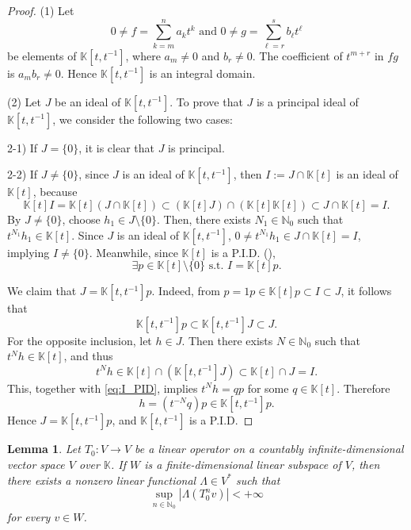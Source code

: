 \documentclass[11pt]{amsart}
\newtheorem{lemma}{Lemma}
\theoremstyle{definition}
\theoremstyle{remark}
\theoremstyle{plain}
\begin{document}
\begin{proof}
(1) Let
\[
0\ne f=\sum_{k=m}^{n}a_kt^k
\text{ and }
0\ne g=\sum_{\ell=r}^{s}b_\ell t^\ell
\]
be elements of \(\mathbb{K}[t,t^{-1}]\), where \(a_m\ne0\) and \(b_r\ne0\).
The coefficient of \(t^{m+r}\) in \(fg\) is \(a_mb_r\ne0\). Hence
\(\mathbb{K}[t,t^{-1}]\) is an integral domain.

\medskip

(2) Let \(J\) be an ideal of
\(\mathbb{K}[t,t^{-1}]\). To prove that \(J\) is a principal ideal of
\(\mathbb{K}[t,t^{-1}]\), we consider the following two cases:

2-1) If \(J=\{0\}\), it is clear that \(J\) is principal.

2-2) If \(J\ne\{0\}\), since \(J\) is an ideal of
\(\mathbb{K}[t,t^{-1}]\), then \(I:=J\cap\mathbb{K}[t]\) is an ideal of
\(\mathbb{K}[t]\), because
\[
\mathbb{K}[t]I
=
\mathbb{K}[t](J\cap\mathbb{K}[t])
\subset
(\mathbb{K}[t]J)\cap(\mathbb{K}[t]\mathbb{K}[t])
\subset
J\cap\mathbb{K}[t]
=I.
\]
By \(J\ne\{0\}\), choose \(h_1\in J\setminus \{0\}\). Then, there exists
\(N_1\in\mathbb{N}_0\) such that \(t^{N_1}h_1\in\mathbb{K}[t]\).  Since \(J\) is an
ideal of \(\mathbb{K}[t,t^{-1}]\), \(0\ne t^{N_1}h_1\in J\cap\mathbb{K}[t]=I\),
implying \(I\ne\{0\}\). Meanwhile, since \(\mathbb{K}[t]\) is a P.I.D.
(\cite[Sec.~8.1, Proposition and Sec.~9.2, Theorem~3]{DF}),
\begin{equation}\label{eq:I_PID}
\exists p\in\mathbb{K}[t]\setminus \{0\}
\text{  s.t. }
I=\mathbb{K}[t]p.
\end{equation}

We claim that \(J=\mathbb{K}[t,t^{-1}]p\). Indeed, from
\(p=1p\in \mathbb{K}[t]p\subset I\subset J\), it follows that
\[
\mathbb{K}[t,t^{-1}]p
\subset
\mathbb{K}[t,t^{-1}]J
\subset J.
\]
For the opposite inclusion, let \(h\in J\). Then there exists
\(N\in\mathbb{N}_0\) such that \(t^Nh\in\mathbb{K}[t]\), and thus
\[
t^Nh\in \mathbb{K}[t]\cap(\mathbb{K}[t,t^{-1}]J)
\subset
\mathbb{K}[t]\cap J
=I.
\]
This, together with \eqref{eq:I_PID}, implies
\(t^Nh=qp\) for some \(q\in\mathbb{K}[t]\). Therefore
\[
h=(t^{-N}q)p\in \mathbb{K}[t,t^{-1}]p.
\]
Hence \(J=\mathbb{K}[t,t^{-1}]p\), and \(\mathbb{K}[t,t^{-1}]\) is a
P.I.D.
\end{proof}

\begin{lemma}\label{lem:bounded-orbit-functionals}
Let \(T_0:V\to V\) be a linear operator on a countably infinite-dimensional
vector space \(V\) over \(\mathbb{K}\).  If \(W\) is a finite-dimensional linear
subspace of \(V\), then there exists a nonzero linear functional
\(\Lambda\in V^*\) such that
\[
\sup_{n\in\mathbb{N}_0}|\Lambda(T_0^n v)|<+\infty
\]
for every \(v\in W\).
\end{lemma}
\end{document}
